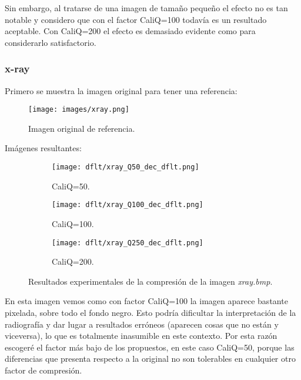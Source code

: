 \documentclass[12pt,a4paper]{article}
\begin{document}
Sin embargo, al tratarse de una imagen de tamaño pequeño el efecto no es tan notable y considero que con el factor CaliQ=100 todavía es un resultado aceptable. Con CaliQ=200 el efecto es demasiado evidente como para considerarlo satisfactorio.\\


\subsubsection{x-ray}
Primero se muestra la imagen original para tener una referencia:
\begin{figure}[H]
    \centering
    \texttt{[image: images/xray.png]}
    \caption[Referencia - x-ray]{Imagen original de referencia.}
    
\end{figure}
    
    \vspace{0.5cm}

Imágenes resultantes:
\begin{figure}   [H]
    \begin{subfigure}{0.30\textwidth}
        \centering
        \texttt{[image: dflt/xray\_Q50\_dec\_dflt.png]}
        \caption{CaliQ=50.}
        
    \end{subfigure}
    \hfill
    \begin{subfigure}{0.30\textwidth}
        \centering
        \texttt{[image: dflt/xray\_Q100\_dec\_dflt.png]}
        \caption{CaliQ=100.}
        
    \end{subfigure}
    \hfill
    \begin{subfigure}{0.30\textwidth}
        \centering
        \texttt{[image: dflt/xray\_Q250\_dec\_dflt.png]}
        \caption{CaliQ=200.}
        
    \end{subfigure}
    
    \caption[Resultados experimentales - x-ray]{Resultados experimentales de la compresión de la imagen \textit{xray.bmp}.}
    
\end{figure}

En esta imagen vemos como con factor CaliQ=100 la imagen aparece bastante pixelada, sobre todo el fondo negro. Esto podría  dificultar la interpretación de la radiografía y dar lugar a resultados erróneos (aparecen cosas que no están y viceversa), lo que es totalmente inasumible en este contexto. Por esta razón escogeré el factor más bajo de los propuestos, en este caso CaliQ=50, porque las diferencias que presenta respecto a la original no son tolerables en cualquier otro factor de compresión.\\
\end{document}
